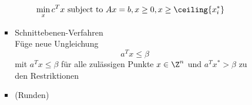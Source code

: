 \begin{beispiel}
\begin{enumerate}
\begin{itemize}
\begin{enumerate}[label = \arabic*. Fall:]
\begin{itemize}
\begin{align*}
						\min_{x} c^{T} &x \text{ subject to } Ax = b , x\geq 0 , x\geq \ceiling{x_{i}^*}
					\end{align*}
					\item Schnittebenen-Verfahren\\
					Füge neue Ungleichung 
					\begin{equation*}
						a^{T} x \leq \beta
					\end{equation*}
					mit $a^{T} x \leq \beta$ für alle zulässigen Punkte $x \in \Z^n$ und $a^{T} x^* > \beta $ zu den Restriktionen		
					\item (Runden)
				\end{itemize}
			\end{enumerate}
		\end{itemize}
\end{enumerate}
\end{beispiel}
